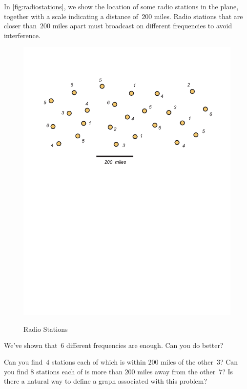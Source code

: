 \begin{example}\label{ex:radiostations}
In \autoref{fig:radiostations}, we show the location of some radio stations in the
plane, together with a scale indicating a distance of~$200$ miles.
Radio stations that are closer than~$200$ miles apart must broadcast
on different frequencies to avoid interference.  

\begin{figure}
\begin{center}
\includegraphics[viewport=46 433 576 706, scale=.6]{intro-figs/3012-fig4}\\
\end{center}
\caption{Radio Stations}
\label{fig:radiostations}
\end{figure}

We've shown that~$6$ different frequencies are enough.  
Can you do better?

Can you find~$4$ stations each of which is within
$200$ miles of the other~$3$?  Can you find $8$ stations each of is more
than $200$ miles away from the other~$7$?   Is there a natural
way to define a graph associated with this problem?
\end{example}

